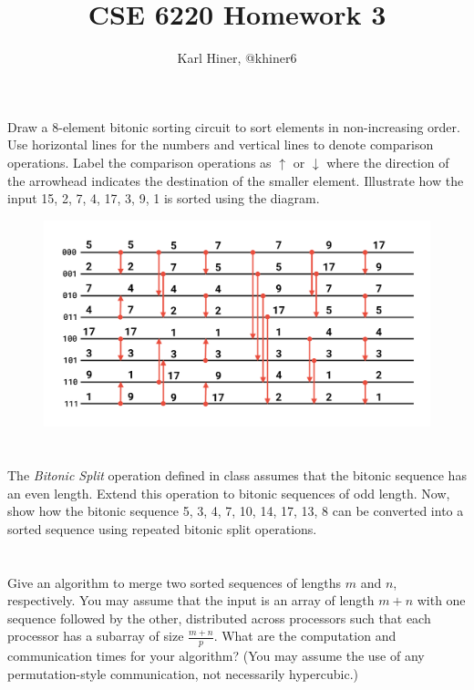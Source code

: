 \documentclass{article}
\begin{document}
\title{CSE 6220 Homework 3}
\author{Karl Hiner, @khiner6}
\date{}
\maketitle

\section{}
Draw a 8-element bitonic sorting circuit to sort elements in non-increasing order.
Use horizontal lines for the numbers and vertical lines to denote comparison operations.
Label the comparison operations as $\uparrow$ or $\downarrow$ where the direction of the arrowhead indicates
the destination of the smaller element.
Illustrate how the input 15, 2, 7, 4, 17, 3, 9, 1 is sorted using the diagram.

\begin{figure}[htb]
  \begin{center}
  \includegraphics[width=120mm]{bitonic_sort_reversed.pdf}
  \end{center}
\end{figure}

\section{}
The \textit{Bitonic Split} operation defined in class assumes that the bitonic sequence has
an even length.
Extend this operation to bitonic sequences of odd length.
Now, show how the bitonic sequence 5, 3, 4, 7, 10, 14, 17, 13, 8 can be converted into a sorted sequence using
repeated bitonic split operations.

\section{}
Give an algorithm to merge two sorted sequences of lengths $m$ and $n$, respectively.
You may assume that the input is an array of length $m+n$ with one sequence followed by the other, distributed across processors such that each processor has a subarray of size $\frac{m+n}{p}$.
What are the computation and communication times for your algorithm?
(You may assume the use of any permutation-style communication, not necessarily hypercubic.)
\end{document}
